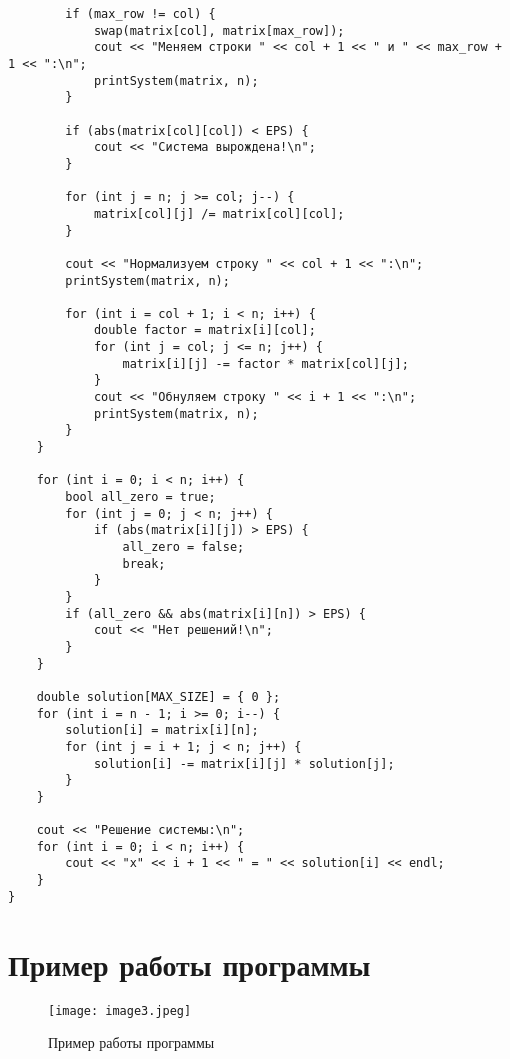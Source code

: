 \documentclass[a4paper,12pt]{article}
\begin{document}
\begin{verbatim}
        if (max_row != col) {
            swap(matrix[col], matrix[max_row]);
            cout << "Меняем строки " << col + 1 << " и " << max_row + 1 << ":\n";
            printSystem(matrix, n);
        }
        
        if (abs(matrix[col][col]) < EPS) {
            cout << "Система вырождена!\n";
        }
        
        for (int j = n; j >= col; j--) {
            matrix[col][j] /= matrix[col][col];
        }
        
        cout << "Нормализуем строку " << col + 1 << ":\n";
        printSystem(matrix, n);
        
        for (int i = col + 1; i < n; i++) {
            double factor = matrix[i][col];
            for (int j = col; j <= n; j++) {
                matrix[i][j] -= factor * matrix[col][j];
            }
            cout << "Обнуляем строку " << i + 1 << ":\n";
            printSystem(matrix, n);
        }
    }
    
    for (int i = 0; i < n; i++) {
        bool all_zero = true;
        for (int j = 0; j < n; j++) {
            if (abs(matrix[i][j]) > EPS) {
                all_zero = false;
                break;
            }
        }
        if (all_zero && abs(matrix[i][n]) > EPS) {
            cout << "Нет решений!\n";
        }
    }
    
    double solution[MAX_SIZE] = { 0 };
    for (int i = n - 1; i >= 0; i--) {
        solution[i] = matrix[i][n];
        for (int j = i + 1; j < n; j++) {
            solution[i] -= matrix[i][j] * solution[j];
        }
    }
    
    cout << "Решение системы:\n";
    for (int i = 0; i < n; i++) {
        cout << "x" << i + 1 << " = " << solution[i] << endl;
    }
}
\end{verbatim}

\section{Пример работы программы}
\begin{figure}[H]
\centering
\texttt{[image: image3.jpeg]}
\caption{Пример работы программы}
\end{figure}
\end{document}
